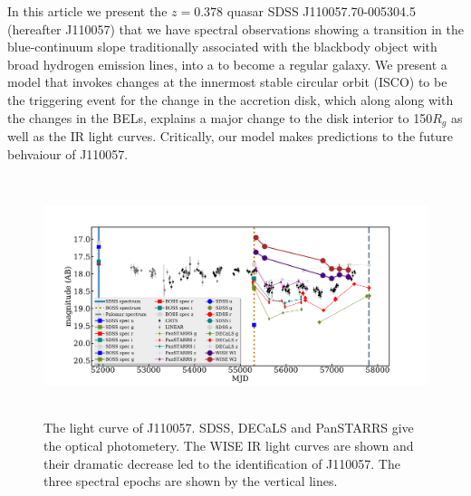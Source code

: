 \documentclass{nature}
\begin{document}
In this article we present the $z=0.378$ quasar SDSS
J110057.70-005304.5 (hereafter J110057) that we have 
spectral observations showing a transition in the blue-continuum 
slope traditionally associated with the blackbody 
 object with broad 
hydrogen emission lines, into a 
to become a regular
galaxy. We present a model that invokes changes at the innermost
stable circular orbit (ISCO) to be the triggering event for the change
in the accretion disk, which along along with the changes in the BELs,
explains a major change to the disk interior to 150$R_{g}$ as well as
the IR light curves. Critically, our model makes predictions to the
future behvaiour of J110057.
 
\begin{figure}
  \centering
  \includegraphics[width=16.00cm, height=7.00cm, trim=0.0cm 0.0cm 0.0cm 0.0cm, clip]
  {../plots/lc/J110057_lc_20171020v1.pdf}
  \caption[]{The light curve of J110057. SDSS, DECaLS and PanSTARRS
    give the optical photometery. The WISE IR light curves are shown and
    their dramatic decrease led to the identification of J110057. The
    three spectral epochs are shown by the vertical lines.}
  \label{fig:J110057_LC_CRTS}
\end{figure}
\end{document}
